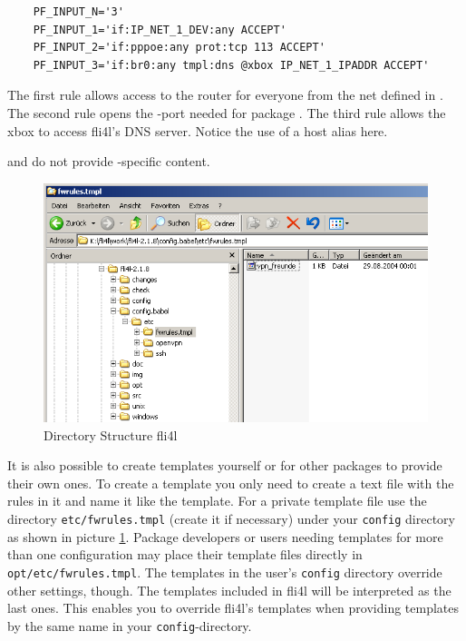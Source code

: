 \begin{example}
\begin{verbatim}
    PF_INPUT_N='3'
    PF_INPUT_1='if:IP_NET_1_DEV:any ACCEPT'
    PF_INPUT_2='if:pppoe:any prot:tcp 113 ACCEPT'
    PF_INPUT_3='if:br0:any tmpl:dns @xbox IP_NET_1_IPADDR ACCEPT'
\end{verbatim}
\end{example}

The first rule allows access to the router for everyone from the net defined 
in . The second rule opens the -port needed
for package . The third rule allows the xbox to access fli4l's
DNS server. Notice the use of a host alias here.

 and  do not provide
-specific content.

\begin{figure}[htbp]
  \centering
  \includegraphics[width=0.9\columnwidth]{etc_fwrules_tmpl_dir}
  \caption{Directory Structure fli4l}
  \label{fig:etc_fwrules_tmpl_dir}
\end{figure}

It is also possible to create templates yourself or for other packages to
provide their own ones. To create a template you only need to create a text
file with the rules in it and name it like the template. For a private template
file use the directory \verb+etc/fwrules.tmpl+ (create it if necessary) under
your \texttt{config} directory as shown in picture \ref{fig:etc_fwrules_tmpl_dir}. 
Package developers or users needing templates for more than one configuration
may place their template files directly in \texttt{opt/etc/fwrules.tmpl}. 
The templates in the user's \texttt{config} directory override other settings, though.
The templates included in fli4l will be interpreted as the last ones. This enables you to
\glqq{}override\grqq{} fli4l's templates when providing templates by
the same name in your \texttt{config}-directory.

